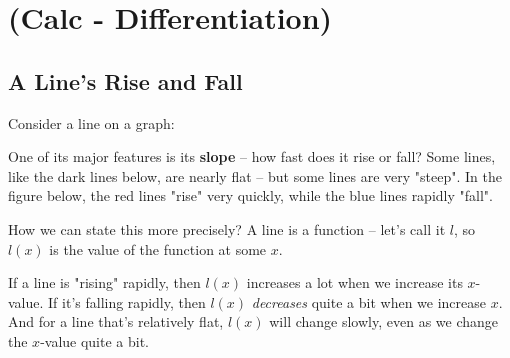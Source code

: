 
\chapter{(Calc - Differentiation)}










\section{A Line's Rise and Fall}


Consider a line on a graph:

\vspace{2in}

One of its major features is its \textbf{slope} -- how fast does it rise or fall? Some lines, like the dark lines below, are nearly flat -- but some lines are very "steep". In the figure below, the red lines "rise" very quickly, while the blue lines rapidly "fall".

\vspace{2in}

How we can state this more precisely? A line is a function -- let's call it $l$, so $l(x)$ is the value of the function at some $x$.

If a line is "rising" rapidly, then $l(x)$ increases a lot when we increase its $x$-value. If it's falling rapidly, then $l(x)$ \textit{decreases} quite a bit when we increase $x$. And for a line that's relatively flat, $l(x)$ will change slowly, even as we change the $x$-value quite a bit.

\vspace{2in}

